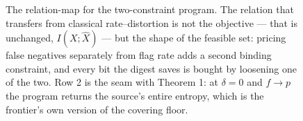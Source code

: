\begin{figure}[t]
\caption{The relation-map for the two-constraint program. The relation that transfers from classical rate--distortion is not the objective --- that is unchanged, $I(X;\hat X)$ --- but the shape of the feasible set: pricing false negatives separately from flag rate adds a second binding constraint, and every bit the digest saves is bought by loosening one of the two. Row 2 is the seam with Theorem 1: at $\delta{=}0$ and $f\to p$ the program returns the source's entire entropy, which is the frontier's own version of the covering floor.}
\label{fig:rdfrel}
\end{figure}
